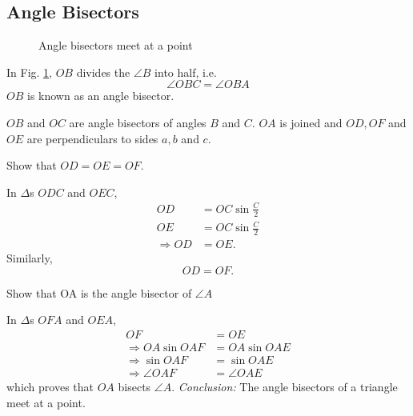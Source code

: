 \subsection{Angle Bisectors}

\begin{figure}[!h]
	\begin{center}
		
		\resizebox{\columnwidth}{!}{}
	\end{center}
	\caption{Angle bisectors meet at a point}
	\label{ch3_angle_bisector}	
\end{figure}

\begin{definition}
	In Fig. \ref{ch3_angle_bisector}, $OB$ divides the  $\angle B$ into half, i.e.\begin{equation}
	\angle OBC = \angle OBA
	\end{equation}
	$OB$ is known as an angle bisector.
\end{definition}
	$OB$ and $OC$ are angle bisectors of angles $B$ and $C$. $OA$ is joined and $OD, OF$ and $OE$ are perpendiculars to sides $a,b$ and $c$.
\begin{problem}
  Show that $OD = OE = OF$.
\end{problem}
\proof In $\Delta$s $ODC$ and $OEC$,
\begin{align}
OD &= OC \sin \frac{C}{2}
\\
OE &= OC \sin \frac{C}{2} 
\\
\Rightarrow OD &=OE.
\end{align}
Similarly,
\begin{equation}
OD = OF.
\end{equation}
%
\begin{problem}
	Show that OA is the angle bisector of $\angle A$
\end{problem}
\proof In $\Delta$s $OFA$ and $OEA$,
\begin{align}
OF &= OE
\\
\Rightarrow OA \sin OAF &= OA \sin OAE \\
\Rightarrow \sin OAF &=  \sin OAE \\
\Rightarrow \angle OAF &= \angle OAE
\end{align}
which proves that $OA$ bisects $\angle A$.
{\em Conclusion:} The angle bisectors of a triangle meet at a point.


